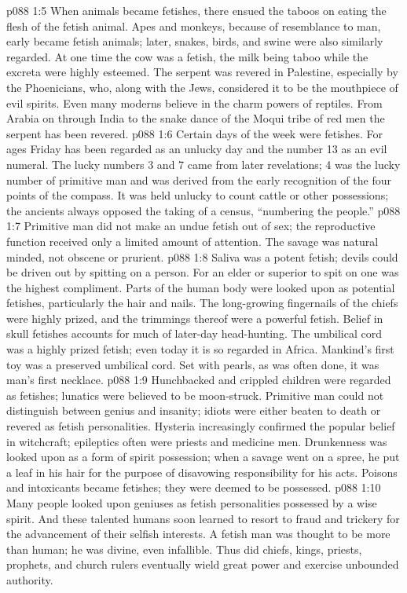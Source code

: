 \vs p088 1:5 When animals became fetishes, there ensued the taboos on eating the flesh of the fetish animal. Apes and monkeys, because of resemblance to man, early became fetish animals; later, snakes, birds, and swine were also similarly regarded. At one time the cow was a fetish, the milk being taboo while the excreta were highly esteemed. The serpent was revered in Palestine, especially by the Phoenicians, who, along with the Jews, considered it to be the mouthpiece of evil spirits. Even many moderns believe in the charm powers of reptiles. From Arabia on through India to the snake dance of the Moqui tribe of red men the serpent has been revered.
\vs p088 1:6 Certain days of the week were fetishes. For ages Friday has been regarded as an unlucky day and the number 13 as an evil numeral. The lucky numbers 3 and 7 came from later revelations; 4 was the lucky number of primitive man and was derived from the early recognition of the four points of the compass. It was held unlucky to count cattle or other possessions; the ancients always opposed the taking of a census, “numbering the people.”
\vs p088 1:7 Primitive man did not make an undue fetish out of sex; the reproductive function received only a limited amount of attention. The savage was natural minded, not obscene or prurient.
\vs p088 1:8 Saliva was a potent fetish; devils could be driven out by spitting on a person. For an elder or superior to spit on one was the highest compliment. Parts of the human body were looked upon as potential fetishes, particularly the hair and nails. The long\hyp{}growing fingernails of the chiefs were highly prized, and the trimmings thereof were a powerful fetish. Belief in skull fetishes accounts for much of later\hyp{}day head\hyp{}hunting. The umbilical cord was a highly prized fetish; even today it is so regarded in Africa. Mankind’s first toy was a preserved umbilical cord. Set with pearls, as was often done, it was man’s first necklace.
\vs p088 1:9 Hunchbacked and crippled children were regarded as fetishes; lunatics were believed to be moon\hyp{}struck. Primitive man could not distinguish between genius and insanity; idiots were either beaten to death or revered as fetish personalities. Hysteria increasingly confirmed the popular belief in witchcraft; epileptics often were priests and medicine men. Drunkenness was looked upon as a form of spirit possession; when a savage went on a spree, he put a leaf in his hair for the purpose of disavowing responsibility for his acts. Poisons and intoxicants became fetishes; they were deemed to be possessed.
\vs p088 1:10 Many people looked upon geniuses as fetish personalities possessed by a wise spirit. And these talented humans soon learned to resort to fraud and trickery for the advancement of their selfish interests. A fetish man was thought to be more than human; he was divine, even infallible. Thus did chiefs, kings, priests, prophets, and church rulers eventually wield great power and exercise unbounded authority.
